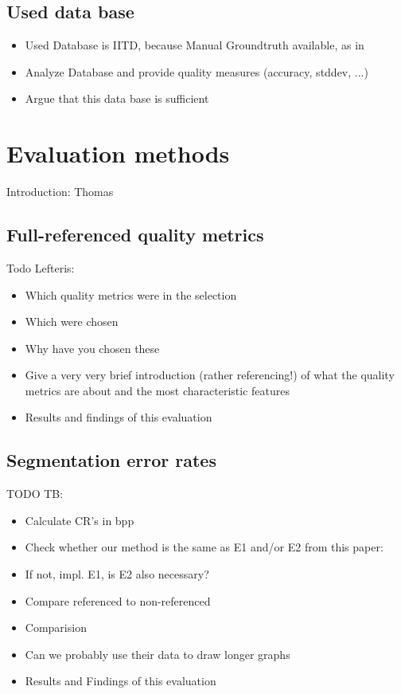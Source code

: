 \documentclass[10pt,twocolumn,letterpaper]{article}
\begin{document}
\subsection{Used data base}


\begin{itemize}
 \item Used Database is IITD, because Manual Groundtruth available, as in \cite{severeCompression}

 \item Analyze Database and provide quality measures (accuracy, stddev, ...)
 \item Argue that this data base is sufficient
\end{itemize}






\section{Evaluation methods}
Introduction: Thomas


\subsection{Full-referenced quality metrics}
Todo Lefteris:
\begin{itemize}
 \item Which quality metrics were in the selection
 \item Which were chosen
 \item Why have you chosen these
 \item Give a very very brief introduction (rather referencing!) of what the quality metrics are about and the most characteristic features
 \item Results and findings of this evaluation
\end{itemize}

\subsection{Segmentation error rates}
TODO TB:
\begin{itemize}
 \item Calculate CR's in bpp
 \item Check whether our method is the same as E1 and/or E2 from this paper: \cite{severeCompression}
 \item If not, impl. E1, is E2 also necessary?
 \item Compare referenced to non-referenced
 \item Comparision
 \item Can we probably use their data to draw longer graphs
 \item Results and Findings of this evaluation
\end{itemize}
\end{document}

